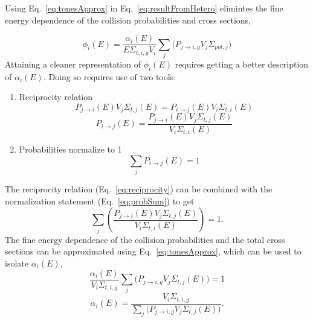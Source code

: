 \documentclass[10pt]{article}
\begin{document}
Using Eq.~\ref{eq:tonesApprox} in Eq.~\ref{eq:resultFromHetero} elimintes the fine energy dependence of the collision probabilities and cross sections,

\begin{equation}\phi_{i}(E)=\frac{\alpha_i(E)}{E\Sigma_{t,i,g}V_i}\sum\limits_j\Big(P_{j\rightarrow i,g}V_{j}\Sigma_{pot,j}\Big)\label{eq:phiWithAlpha}\end{equation}
Attaining a cleaner representation of $\phi_i(E)$ requires getting a better description of $\alpha_i(E)$. Doing so requires use of two tools:
  \begin{enumerate}
    \item Reciprocity relation
      \begin{equation*}P_{j\rightarrow i}(E)V_{j}\Sigma_{t,j}(E)=P_{i\rightarrow j}(E)V_{i}\Sigma_{t,i}(E)\end{equation*}
        \begin{equation}P_{i\rightarrow j}(E)=\frac{P_{j\rightarrow i}(E)V_{j}\Sigma_{t,j}(E)}{V_{i}\Sigma_{t,i}(E)}\label{eq:reciprocity}\end{equation}
    \item Probabilities normalize to 1
      \begin{equation}\sum\limits_{j}P_{i\rightarrow j}(E)=1\label{eq:probSum}\end{equation}
  \end{enumerate}


The reciprocity relation (Eq.~\ref{eq:reciprocity}) can be combined with the normalization statement (Eq.~\ref{eq:probSum}) to get
\begin{equation}\sum\limits_{j}\left(\frac{P_{j\rightarrow i}(E)V_{j}\Sigma_{t,j}(E)}{V_{i}\Sigma_{t,i}(E)}\right)=1.\label{eq:endOfReciprocity}\end{equation}
The fine energy dependence of the collision probabilities and the total cross sections can be approximated using Eq.~\ref{eq:tonesApprox}, which can be used to isolate $\alpha_i(E)$,
\begin{equation}\frac{\alpha_i(E)}{V_i\Sigma_{t,i,g}}\sum\limits_{j}\Big(P_{j\rightarrow i,g}V_{j}\Sigma_{t,j}(E)\Big)=1\end{equation}
\begin{equation}\alpha_i(E)=\frac{V_i\Sigma_{t,i,g}}{\sum\limits_{j}\Big(P_{j\rightarrow i,g}V_{j}\Sigma_{t,j}(E)\Big)}.\end{equation}
\end{document}
